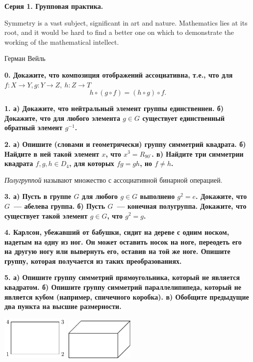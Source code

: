 \documentclass[10pt]{article}
\begin{document}
\begin{landscape}
\begin{multicols}{2}
	\columnbreak

	\centerline{\bf{Серия 1. Групповая практика. }}

	\epigraph{Symmetry is a vast subject, significant in art and nature. Mathematics lies at its root, and it would be hard to find a better one on which to demonstrate the working of the mathematical intellect.}{Герман Вейль}

	\bf{0.} Докажите, что композиция отображений ассоциативна, т.е., что для $f \colon X \to Y, g \colon Y \to Z, \ h \colon Z \to T$
	\[
		h \circ (g \circ f) = (h \circ g) \circ f.
	\]

	\bf{1.} а) Докажите, что нейтральный элемент группы единственнен. б) Докажите, что для любого элемента $g \in G$ существует единственный обратный элемент $g^{-1}$. 

	\bf{2.} а) Опишите (словами и геометрически) группу симметрий квадрата. б) Найдите в ней такой элемент $x$, что $x^3 = R_{90^{\circ}}$. в) Найдите три симметрии квадрата $f, g, h \in D_{4}$, для которых $fg = gh$, но $f \neq h$.

	\begin{definition} 
		\emph{Полугруппой} называют множество с ассоциативной бинарной операцией. 
	\end{definition}

	\bf{3.} а)  Пусть в группе $G$ для любого $g \in G$ выполнено $g^2 = e$. Докажите, что $G$~--- абелева группа.  б) Пусть $G$~--- конечная полугруппа. Докажите, что существует такой элемент $g \in G$, что $g^2 = g$.

	\bf{4.} Карлсон, убежавший от бабушки, сидит на дереве с одним носком, надетым на одну из ног. Он может оставить носок на ноге, переодеть его на другую ногу или вывернуть его, оставив на той же ноге. Опишите группу, которая получается из таких преобразованиях. 

	\bf{5.} а) Опишите группу симметрий прямоугольника, который не является квадратом. б) Опишите группу симметрий параллелипипеда, который не является кубом (например, спичечного коробка). в) Обобщите предыдущие два пункта на высшие размерности. 

	\begin{center}
	\begin{minipage}{6in}
		\includegraphics[width=0.25\textwidth]{pic/pic_1.pdf}
		\hspace{10mm}
		\includegraphics[width=0.25\textwidth]{pic/pic_2.pdf}
	\end{minipage}
	\end{center}


	

	\end{multicols}
	\end{landscape}
\end{document}
